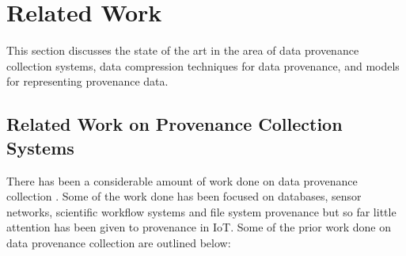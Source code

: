 


\chapter{Related Work}\label{background}

This section discusses the state of the art in the area of data provenance collection systems, data compression techniques for data provenance, and models for representing provenance data.


\section{Related Work on Provenance Collection Systems}

There has been a considerable amount of work done on data provenance collection \cite{_general-purpose_2012, bates_trustworthy_2015, gessiou_towards_2012, muniswamy_reddy_provenance_2010}. Some of the work done has been focused on databases, sensor networks, scientific workflow systems and file system provenance but so far little attention has been given to provenance in IoT. Some of the prior work done on data provenance collection are outlined below:

